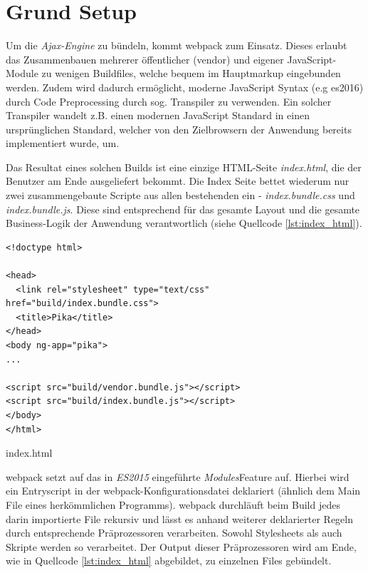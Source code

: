 \section{Grund Setup}
\label{sec:grund_setup}

Um die \emph{Ajax-Engine} zu bündeln, kommt \gls{webpack} zum Einsatz. Dieses erlaubt das Zusammenbauen mehrerer öffentlicher (vendor) und eigener JavaScript-Module zu wenigen Buildfiles, welche bequem im Hauptmarkup eingebunden werden. Zudem wird dadurch ermöglicht, moderne JavaScript Syntax (e.g \gls{es2016}) durch Code Preprocessing durch sog. Transpiler zu verwenden. Ein solcher Transpiler wandelt z.B. einen modernen JavaScript Standard in einen ursprünglichen Standard, welcher von den Zielbrowsern der Anwendung bereits implementiert wurde, um.

Das Resultat eines solchen Builds ist eine einzige HTML-Seite \emph{index.html}, die der Benutzer am Ende ausgeliefert bekommt. Die Index Seite bettet wiederum nur zwei zusammengebaute Scripte aus allen bestehenden ein - \emph{index.bundle.css} und \emph{index.bundle.js}. Diese sind entsprechend für das gesamte Layout und die gesamte Business-Logik der Anwendung verantwortlich (siehe Quellcode \ref{lst:index_html}).

\begin{listing}[H]
\begin{verbatim}
<!doctype html>

<head>
  <link rel="stylesheet" type="text/css" href="build/index.bundle.css">
  <title>Pika</title>
</head>
<body ng-app="pika">
...

<script src="build/vendor.bundle.js"></script>
<script src="build/index.bundle.js"></script>
</body>
</html>

\end{verbatim}
\caption{index.html}
\label{lst:index_html}
\end{listing}

\gls{webpack} setzt auf das in \emph{ES2015} eingeführte \emph{Modules}Feature auf. Hierbei wird ein Entryscript in der \gls{webpack}-Konfigurationsdatei deklariert (ähnlich dem Main File eines herkömmlichen Programms). \gls{webpack} durchläuft beim Build jedes darin importierte File rekursiv und lässt es anhand weiterer deklarierter Regeln durch entsprechende Präprozessoren verarbeiten. Sowohl Stylesheets als auch Skripte werden so verarbeitet. Der Output dieser Präprozessoren wird am Ende, wie in Quellcode \ref{lst:index_html} abgebildet, zu einzelnen Files gebündelt.

